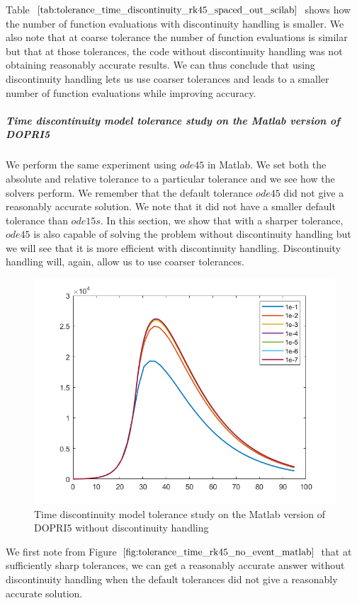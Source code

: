 Table $\ref{tab:tolerance_time_discontinuity_rk45_spaced_out_scilab}$ shows how the number of function evaluations with discontinuity handling is smaller. We also note that at coarse tolerance the number of function evaluations is similar but that at those tolerances, the code without discontinuity handling was not obtaining reasonably accurate results. We can thus conclude that using discontinuity handling lets us use coarser tolerances and leads to a smaller number of function evaluations while improving accuracy.


\subparagraph{Time discontinuity model tolerance study on the Matlab version of DOPRI5}
We perform the same experiment using $ode45$ in Matlab. We set both the absolute and relative tolerance to a particular tolerance and we see how the solvers perform. We remember that the default tolerance $ode45$ did not give a reasonably accurate solution. We note that it did not have a smaller default tolerance than $ode15s$. In this section, we show that with a sharper tolerance, $ode45$ is also capable of solving the problem without discontinuity handling but we will see that it is more efficient with discontinuity handling. Discontinuity handling will, again, allow us to use coarser tolerances.

\begin{figure}[h]
\centering
\includegraphics[width=0.7\linewidth]{./figures/tolerance_time_rk45_no_event_matlab}
\caption{Time discontinuity model tolerance study on the Matlab version of DOPRI5 without discontinuity handling}
\label{fig:tolerance_time_rk45_no_event_matlab}
\end{figure}

We first note from Figure $\ref{fig:tolerance_time_rk45_no_event_matlab}$ that at sufficiently sharp tolerances, we can get a reasonably accurate answer without discontinuity handling when the default tolerances did not give a reasonably accurate solution.

